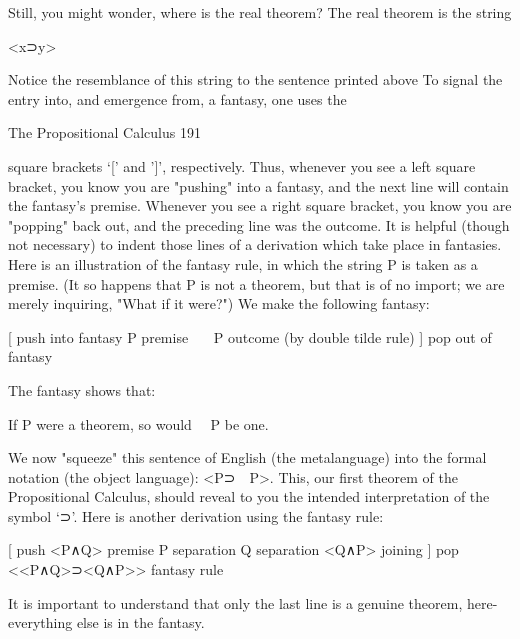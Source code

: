 Still, you might wonder, where is the real theorem? The real theorem is the string

                                           <x⊃y>

Notice the resemblance of this string to the sentence printed above
       To signal the entry into, and emergence from, a fantasy, one uses the



The Propositional Calculus                                                                191

square brackets `[' and ']', respectively. Thus, whenever you see a left square bracket, you
know you are "pushing" into a fantasy, and the next line will contain the fantasy's
premise. Whenever you see a right square bracket, you know you are "popping" back out,
and the preceding line was the outcome. It is helpful (though not necessary) to indent
those lines of a derivation which take place in fantasies.
        Here is an illustration of the fantasy rule, in which the string P is taken as a
premise. (It so happens that P is not a theorem, but that is of no import; we are merely
inquiring, "What if it were?") We make the following fantasy:

       [                                     push into fantasy
           P                                 premise
           ~~~P                              outcome (by double tilde rule)
       ]                                     pop out of fantasy

       The fantasy shows that:

       If P were a theorem, so would ~~P be one.

       We now "squeeze" this sentence of English (the metalanguage) into the formal
notation (the object language): <P⊃~~P>. This, our first theorem of the Propositional
Calculus, should reveal to you the intended interpretation of the symbol `⊃'.
       Here is another derivation using the fantasy rule:

       [                                     push
           <P∧Q>                             premise
           P                                 separation
           Q                                 separation
           <Q∧P>                             joining
       ]                                     pop
       <<P∧Q>⊃<Q∧P>>                         fantasy rule

It is important to understand that only the last line is a genuine theorem, here-everything
else is in the fantasy.

